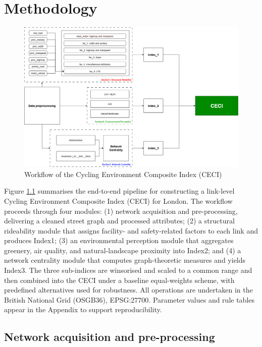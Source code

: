 \documentclass[
  12pt,
  oneside]{book}
\begin{document}
\chapter{Methodology}\label{methodology}

\begin{figure}

{\centering \includegraphics[width=1\linewidth]{general_images/flow} 

}

\caption{Workflow of the Cycling Environment Composite Index (CECI)}\label{fig:flow}
\end{figure}

Figure \ref{fig:flow} summarises the end-to-end pipeline for constructing a link-level Cycling Environment Composite Index (CECI) for London. The workflow proceeds through four modules: (1) network acquisition and pre-processing, delivering a cleaned street graph and processed attributes; (2) a structural rideability module that assigns facility- and safety-related factors to each link and produces Index1; (3) an environmental perception module that aggregates greenery, air quality, and natural-landscape proximity into Index2; and (4) a network centrality module that computes graph-theoretic measures and yields Index3. The three sub-indices are winsorised and scaled to a common range and then combined into the CECI under a baseline equal-weights scheme, with predefined alternatives used for robustness. All operations are undertaken in the British National Grid (OSGB36), EPSG:27700. Parameter values and rule tables appear in the Appendix to support reproducibility.

\section{Network acquisition and pre-processing}\label{network-acquisition-and-pre-processing}
\end{document}
